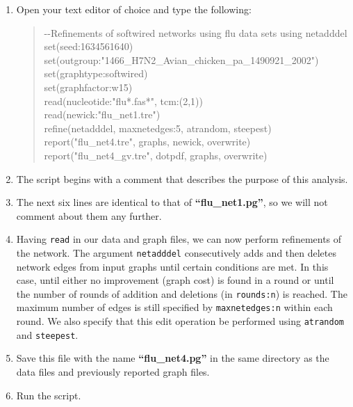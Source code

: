 \documentclass[11pt]{article}
\begin{document}
\begin {enumerate}

\item Open your text editor of choice and type the following:
	
	\begin{quote}	
	-\/-Refinements of softwired networks using flu data sets using netadddel\\
	set(seed:1634561640)\\
	set(outgroup:"1466\_H7N2\_Avian\_chicken\_pa\_1490921\_2002")\\
	set(graphtype:softwired)\\
	set(graphfactor:w15)\\ 
	read(nucleotide:"flu*.fas*", tcm:(2,1))\\
	read(newick:"flu\_net1.tre")\\
	refine(netadddel, maxnetedges:5, atrandom, steepest)\\
	report("flu\_net4.tre", graphs, newick, overwrite)\\
	report("flu\_net4\_gv.tre", dotpdf, graphs, overwrite)
	\end{quote}

\item The script begins with a comment that describes the purpose of this 
analysis.

\item The next six lines are identical to that of \textbf{``flu\_net1.pg''}, so we 
will not comment about them any further. 

\item Having \texttt{read} in our data and graph files, we can now perform 
refinements of the network. The argument \texttt{netadddel} consecutively 
adds and then deletes network edges from input graphs until certain conditions
are met. In this case, until either no improvement (graph cost) is found
in a round or until the number of rounds of addition and deletions (in \texttt{rounds:n}) 
is reached. The maximum number of edges is still specified by \texttt{maxnetedges:n} 
within each round. We also specify that this edit operation be performed using 
\texttt{atrandom} 
and \texttt{steepest}.

\item Save this file with the name \textbf{``flu\_net4.pg''} in the same directory 
as the data files and previously reported graph files.

\item Run the script.


\end{enumerate}
\end{document}
